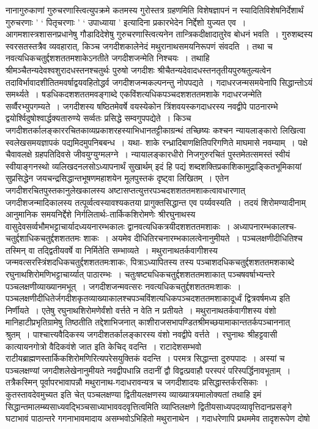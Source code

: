 \documentclass[10pt, openany]{book}
\begin{document}
नानागुरुकाणां गुरुचरणास्त्वित्युपक्रमे कतमस्य गुरोस्तत्र ग्रहणमिति विशेषज्ञापनं न स्यादितिविशेषनिर्देशार्थं {\qt  गुरुचरणाः ' ` पितृचरणाः ' ` उपाध्याया '} इत्यादिना प्रकारभेदेन निर्द्देशो युज्यत एव~। आगमशास्त्रशासनप्रधानेषु गौडादिदेशेषु गुरुचरणास्त्वित्यनेन तान्त्रिकदीक्षादातुरेव बोधनं भवति~। गुरुशब्दस्य स्वरसतस्तत्रैव व्यवहारात्, किञ्च जगदीशकालेनेदं मथुरानाथसमयनिरूपणं संवदति~। तथा च नवत्यधिकचतुर्द्दशशततमशाकेऽनतीते जगदीशजन्मेति निश्चयः~। तथाहि श्रीमञ्चैतन्यदेवश्वशुरादधस्तनश्चतुर्थः पुरुषो जगदीशः श्रीचैतन्यदेवादधस्तनतृतीयपुरुषतुल्यत्वेन तदाविर्भावादशीतितमवर्षाद्वयवहितोद्धर्व जगदीशजन्मकल्पनन्तु नोपपद्यते~। गदाधरजन्मसमयेनापि सिद्धान्तोऽयं समर्थ्यते~। षडधिकदशशततमवङ्गाब्दे एकविंशत्यधिकपञ्चदशशततमशाके गदाधरजन्मेति सर्व्वैरभ्युपगम्यते~। जगदीशस्य  षष्ठितमेवर्षे वयस्येकोन त्रिंशवयस्कगदाधरस्य नवद्वीपे पाठनारम्भे द्वयोर्श्विदुषोश्वार्द्धक्यतारुण्ये सर्व्वतः प्रसिद्धे सम्वगुपपद्येते~। किञ्च जगदीशतर्कालङ्काररचितकाव्यप्रकाशरहस्याभिधानतट्टीकाग्रन्थं तच्छिष्यः
\newpage
\noindent कश्चन न्यायलाङ्कारो लिखित्वा स्वलेखसमयज्ञापकं पद्यमिदमुपनिबबन्ध~। यथा-
{\qt शाके रन्ध्रादिबाणक्षितिपरिगणिते माघमासे नवम्याम्~। पक्षे चैवावलक्षे ग्रहपतिदिवसे जीवयुग्युग्मलग्ने~। न्यायालङ्कारधीरो निजगुरुरचितं पुस्तमेतत्समस्तं स्वीयं स्वीयाङ्गनस्थो व्यलिखदनलसोऽध्यापनार्थं सुखार्थम्} इदं हि पद्यं शब्दशक्तिप्रकाशिकामुद्राङ्कितभूमिकायां सुप्रसिद्धेन  जयचन्द्रसिद्धान्तभूषणमहाशयेन मूलपुस्तकं दृष्ट्वा लिखितम्~। एतेन जगदीशरचितपुस्तकानुलेखकालस्य अष्टासप्तत्युत्तरपञ्चदशशततमशाकत्वावधारणात् जगदीशजन्मादिकालस्य तत्पूर्व्वत्वस्यावश्यकतया प्रागुक्तसिद्धान्त एव पर्य्यवस्यति~। तदयं शिरोमण्यादीनाम् आनुमानिक समयनिर्द्देशे निर्गलितार्थः-तार्किकशिरोमणेः श्रीरघुनाथस्य वासुदेवसर्व्वभौमभट्टाचार्यादध्ययनारम्भकालः द्वानवत्यधिकत्रयीदशशततमशाकः~। अध्यापनारम्भकालश्च-चतुर्द्दशाधिकचतुर्द्दशशततमः शाकः~। अयमेव दीधितिरचनारम्भकालत्वेनानुमीयते~। पञ्चलक्षणीदीधितिश्च तस्मिन् वा तद्द्वितीयवर्षे वा निर्मितेति सम्भाव्यते~। मथुरानाथतर्कवागीशस्य जन्मवत्सरस्त्रिंशदधिकचतुर्द्दशशततमःशाकः, पित्राऽध्यापितस्य तस्य पञ्चाशदधिकचतुर्द्दशशततमशकाब्दे रघुनाथशिरोमणिभट्टाचार्य्यात् पाठारम्भः~। चतुःषष्ट्यधिकचतुर्द्दशशततमशाकात् पञ्चषवर्षाभ्यन्तरे पञ्चलक्षणीव्याख्यानमभूत्~। जगदीशजन्मवत्सरः {\qt नवत्यधिकचतुर्द्दशशततमःशाकः~}। पञ्चलक्षणीदीधितेर्जगदीशकृतव्याख्याकालश्चपञ्चविंशत्यधिकपञ्चदशततमशाकादूर्ध्वं {\qt द्वित्रवर्षमध्य} इति निर्णीयते~। एतेषु रघुनाथशिरोमणेर्वंशो वर्त्तते न वेति न प्रतीयते~। मथुरानाथतर्कवागीशस्य वंशो मानिहाटीप्रभृतिग्रामेषु तिष्ठतीति तद्देशाभिजनात् काशीराजसभापण्डितश्रीमच्छयामाकान्ततर्कपञ्चाननात् श्रुतम्~। पाश्चात्त्यवैदिकस्य जगदीशतर्कालङ्कारस्य वंशो नवद्वीपे वर्त्तते~। रघुनाथः श्रीहट्टवासी कात्यायनगोत्रो वैदिकवंशे जात इति केचिद् वदन्ति~। राटादेशसम्भवो राटीयब्राह्मणस्तार्किकशिरोमणिरित्यपरेसयुक्तिकं वदन्ति~। परमत्र सिद्धान्ता दुरुपपादः~। अस्यां च पञ्चलक्षण्यां जगदीशलेखेनानुमीयते नवद्वीपधान्नि तदानीं द्वौ विद्वत्प्रवाहौ परस्परं परिस्पर्द्धिनावभूताम्~। तत्रैकस्मिन् पूर्वापरभावापन्नौ मथुरानाथ-गदाधरावन्यत्र च जगदीशादयः प्रसिद्धास्तर्करसिकाः~। कुतस्तावदेवमुच्यत इति चेत् पञ्चलक्षण्या द्वितीयलक्षणस्य व्याख्यात्रयमालोक्यतां तथाहि इमं सिद्धान्तमालम्ब्यसाध्यवद्भिञ्चसाध्याभाववदवृत्तित्वमिति व्याप्तिलक्षणे द्वितीयसाध्यपदव्यावृत्तिदानप्रसङ्गे घटाभावं पाठान्तरे गगनाभावमादाय असम्भवोऽभिहितो मथुरानाथेन~। गदाधरेणापि प्रथममेव तादृशरूपेण दोषो
\end{document}

